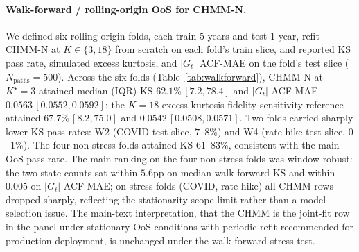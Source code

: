 \paragraph{Walk-forward / rolling-origin OoS for CHMM-N.}
We defined six rolling-origin folds, each train $5$ years and test $1$ year, refit CHMM-N at $K \in \{3, 18\}$ from scratch on each fold's train slice, and reported KS pass rate, simulated excess kurtosis, and $|G_t|$ ACF-MAE on the fold's test slice ($N_{\text{paths}} = 500$). Across the six folds (Table~\ref{tab:walkforward}), CHMM-N at $K^\star = 3$ attained median (IQR) KS $62.1\%\,[7.2, 78.4]$ and $|G_t|$ ACF-MAE $0.0563\,[0.0552, 0.0592]$; the $K = 18$ excess kurtosis-fidelity sensitivity reference attained $67.7\%\,[8.2, 75.0]$ and $0.0542\,[0.0508, 0.0571]$. Two folds carried sharply lower KS pass rates: W2 (COVID test slice, $7$--$8\%$) and W4 (rate-hike test slice, $0$--$1\%$). The four non-stress folds attained KS $61$--$83\%$, consistent with the main OoS pass rate. The main ranking on the four non-stress folds was window-robust: the two state counts sat within $5.6$pp on median walk-forward KS and within $0.005$ on $|G_t|$ ACF-MAE; on stress folds (COVID, rate hike) all CHMM rows dropped sharply, reflecting the stationarity-scope limit rather than a model-selection issue. The main-text interpretation, that the CHMM is the joint-fit row in the panel under stationary OoS conditions with periodic refit recommended for production deployment, is unchanged under the walk-forward stress test.

